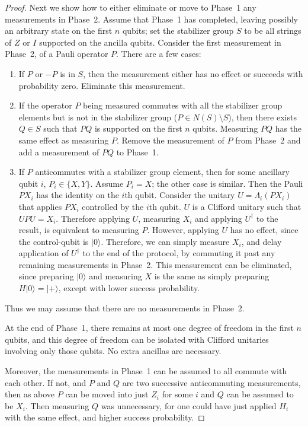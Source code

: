 \documentclass[11pt]{article}
\def\ket #1{\vert #1\rangle}
\theoremstyle{note}
\begin{document}
\begin{proof}
Next we show how to either eliminate or move to Phase~1 any measurements in Phase~2.  Assume that Phase~1 has completed, leaving possibly an arbitrary state on the first $n$ qubits; set the stabilizer group $S$ to be all strings of $Z$ or $I$ supported on the ancilla qubits.  Consider the first measurement in Phase~2, of a Pauli operator $P$.  There are a few cases:
\begin{enumerate}
\item If $P$ or $-P$ is in $S$, then the measurement either has no effect or succeeds with probability zero.  Eliminate this measurement. 
\item If the operator $P$ being measured commutes with all the stabilizer group elements but is not in the stabilizer group ($P \in N(S) \setminus S$), then there exists $Q \in S$ such that $P Q$ is supported on the first $n$ qubits.  Measuring $P Q$ has the same effect as measuring $P$.  Remove the measurement of $P$ from Phase~2 and add a measurement of $P Q$ to Phase~1.  
\item If $P$ anticommutes with a stabilizer group element, then for some ancillary qubit $i$, $P_i \in \{ X, Y \}$.  Assume $P_i = X$; the other case is similar.   Then the Pauli $P X_i$ has the identity on the $i$th qubit.  Consider the unitary $U = \Lambda_i(P X_i)$ that applies $P X_i$ controlled by the $i$th qubit.  $U$ is a Clifford unitary such that $U P U = X_i$.  Therefore applying $U$, measuring $X_i$ and applying $U^\dagger$ to the result, is equivalent to measuring $P$.  However, applying $U$ has no effect, since the control-qubit is $\ket 0$.  Therefore, we can simply measure $X_i$, and delay application of $U^\dagger$ to the end of the protocol, by commuting it past any remaining measurements in Phase~2.  This measurement can be eliminated, since preparing $\ket 0$ and measuring $X$ is the same as simply preparing $H \ket{0} = \ket{+}$, except with lower success probability.
\end{enumerate}
Thus we may assume that there are no measurements in Phase~2.  

At the end of Phase~1, there remains at most one degree of freedom in the first $n$ qubits, and this degree of freedom can be isolated with Clifford unitaries involving only those qubits.  No extra ancillas are necessary.  

Moreover, the measurements in Phase~1 can be assumed to all commute with each other.  If not, and $P$ and $Q$ are two successive anticommuting measurements, then as above $P$ can be moved into just $Z_i$ for some $i$ and $Q$ can be assumed to be $X_i$.  Then measuring $Q$ was unnecessary, for one could have just applied $H_i$ with the same effect, and higher success probability.
\end{proof}
\end{document}
